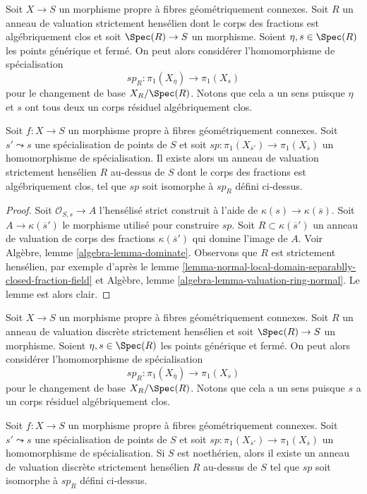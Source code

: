 \noindent
Soit $X \to S$ un morphisme propre à fibres géométriquement connexes.
Soit $R$ un anneau de valuation strictement hensélien dont le corps des fractions
est algébriquement clos et soit $\Spec(R) \to S$
un morphisme. Soient $\eta, s \in \Spec(R)$ les points générique et fermé.
On peut alors considérer l'homomorphisme de spécialisation
$$
sp_R : \pi_1(X_\eta) \to \pi_1(X_s)
$$
pour le changement de base $X_R/\Spec(R)$. Notons que cela a un sens puisque
$\eta$ et $s$ ont tous deux un corps résiduel algébriquement clos.

\begin{lemma}
\label{lemma-specialization-map-valuation-ring}
Soit $f : X \to S$ un morphisme propre à fibres géométriquement connexes.
Soit $s' \leadsto s$ une spécialisation de points de $S$ et soit
$sp : \pi_1(X_{\overline{s}'}) \to \pi_1(X_{\overline{s}})$
un homomorphisme de spécialisation. Il existe alors un anneau de valuation strictement hensélien
$R$ au-dessus de $S$ dont le corps des fractions est algébriquement clos,
tel que $sp$ soit isomorphe à $sp_R$ défini ci-dessus.
\end{lemma}

\begin{proof}
Soit $\mathcal{O}_{S, s} \to A$ l'hensélisé strict
construit à l'aide de $\kappa(s) \to \kappa(\overline{s})$.
Soit $A \to \kappa(\overline{s}')$ le morphisme utilisé pour construire $sp$.
Soit $R \subset \kappa(\overline{s}')$ un anneau de valuation de
corps des fractions $\kappa(\overline{s}')$ qui domine l'image de $A$.
Voir Algèbre, lemme \ref{algebra-lemma-dominate}.
Observons que $R$ est strictement hensélien, par exemple d'après le
lemme \ref{lemma-normal-local-domain-separablly-closed-fraction-field}
et Algèbre, lemme \ref{algebra-lemma-valuation-ring-normal}.
Le lemme est alors clair.
\end{proof}

\noindent
Soit $X \to S$ un morphisme propre à fibres géométriquement connexes.
Soit $R$ un anneau de valuation discrète strictement hensélien et soit
$\Spec(R) \to S$ un morphisme. Soient $\eta, s \in \Spec(R)$ les points
générique et fermé. On peut alors considérer l'homomorphisme de spécialisation
$$
sp_R : \pi_1(X_{\overline{\eta}}) \to \pi_1(X_s)
$$
pour le changement de base $X_R/\Spec(R)$. Notons que cela a un sens puisque $s$
a un corps résiduel algébriquement clos.

\begin{lemma}
\label{lemma-specialization-map-discrete-valuation-ring}
Soit $f : X \to S$ un morphisme propre à fibres géométriquement connexes.
Soit $s' \leadsto s$ une spécialisation de points de $S$ et soit
$sp : \pi_1(X_{\overline{s}'}) \to \pi_1(X_{\overline{s}})$
un homomorphisme de spécialisation. Si $S$ est noethérien, alors
il existe un anneau de valuation discrète strictement hensélien
$R$ au-dessus de $S$ tel que $sp$ soit isomorphe à $sp_R$
défini ci-dessus.
\end{lemma}

